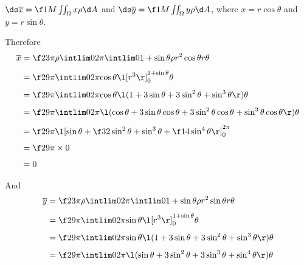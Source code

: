 \documentclass[a4paper]{article}
\begin{document}
$\ds \overline x = \f1M \iint_\Omega x \rho \d A$ and $\ds \overline y = \f1M \iint_\Omega y \rho \d A$, where $x = r\cos\theta$ and $y = r\sin\theta$.

Therefore \begin{align*}
\overline x &= \f2{3\pi\rho} \intlim 0{2\pi} {\intlim 0 {1 + \sin \theta} {\rho r^2 \cos \theta} r} \theta\\[1ex]
&= \f2{9\pi} \intlim 0{2\pi} {\cos \theta \l[r^3\r]_0^{1 + \sin\theta}} \theta\\[1ex]
&= \f2{9\pi} \intlim 0{2\pi} {\cos \theta \l( 1 + 3\sin\theta + 3\sin^2 \theta + \sin^3 \theta \r)} \theta\\[1ex]
 &= \f2{9\pi} \intlim 0{2\pi} {\l( \cos\theta + 3\sin\theta \cos\theta + 3\sin^2 \theta \cos\theta + \sin^3 \theta \cos\theta \r)} \theta\\[1ex]
&= \f2{9\pi} \l[ \sin\theta + \f32 \sin^2 \theta + \sin^3 \theta + \f14 \sin^4 \theta\r]_0^{2\pi}\\[1ex]
&= \f2{9\pi} \times 0 \\[1ex]
&= 0
\end{align*}

And \begin{align*}
\overline y &= \f2{3\pi\rho} \intlim 0{2\pi} {\intlim 0 {1 + \sin \theta} {\rho r^2 \sin \theta} r} \theta\\[1ex]
&= \f2{9\pi} \intlim 0{2\pi} {\sin \theta \l[r^3\r]_0^{1 + \sin\theta}} \theta\\[1ex]
&= \f2{9\pi} \intlim 0{2\pi} {\sin \theta \l( 1 + 3\sin\theta + 3\sin^2 \theta + \sin^3 \theta \r)} \theta\\[1ex]
&= \f2{9\pi} \intlim 0{2\pi} {\l( \sin\theta + 3\sin^2 \theta + 3\sin^3 \theta + \sin^4 \theta \r)} \theta\\[1ex]
\end{align*}



\subsection{~}

\end{document}
